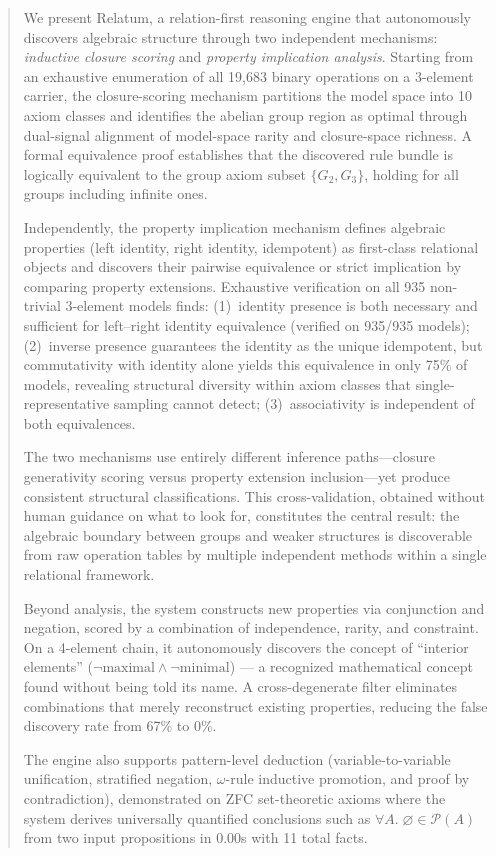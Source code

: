 \begin{abstract}

We present Relatum, a relation-first reasoning engine that autonomously discovers algebraic structure through two independent mechanisms: \emph{inductive closure scoring} and \emph{property implication analysis}. Starting from an exhaustive enumeration of all 19{,}683 binary operations on a 3-element carrier, the closure-scoring mechanism partitions the model space into 10 axiom classes and identifies the abelian group region as optimal through dual-signal alignment of model-space rarity and closure-space richness. A formal equivalence proof establishes that the discovered rule bundle is logically equivalent to the group axiom subset $\{G_2, G_3\}$, holding for all groups including infinite ones.

Independently, the property implication mechanism defines algebraic properties (left identity, right identity, idempotent) as first-class relational objects and discovers their pairwise equivalence or strict implication by comparing property extensions. Exhaustive verification on all 935 non-trivial 3-element models finds: (1)~identity presence is both necessary and sufficient for left--right identity equivalence (verified on 935/935 models); (2)~inverse presence guarantees the identity as the unique idempotent, but commutativity with identity alone yields this equivalence in only 75\% of models, revealing structural diversity within axiom classes that single-representative sampling cannot detect; (3)~associativity is independent of both equivalences.

The two mechanisms use entirely different inference paths---closure generativity scoring versus property extension inclusion---yet produce consistent structural classifications. This cross-validation, obtained without human guidance on what to look for, constitutes the central result: the algebraic boundary between groups and weaker structures is discoverable from raw operation tables by multiple independent methods within a single relational framework.

Beyond analysis, the system constructs new properties via conjunction and negation, scored by a combination of independence, rarity, and constraint. On a 4-element chain, it autonomously discovers the concept of ``interior elements'' ($\lnot\text{maximal} \wedge \lnot\text{minimal}$) --- a recognized mathematical concept found without being told its name. A cross-degenerate filter eliminates combinations that merely reconstruct existing properties, reducing the false discovery rate from 67\% to 0\%.

The engine also supports pattern-level deduction (variable-to-variable unification, stratified negation, $\omega$-rule inductive promotion, and proof by contradiction), demonstrated on ZFC set-theoretic axioms where the system derives universally quantified conclusions such as $\forall A.\;\varnothing \in \mathcal{P}(A)$ from two input propositions in 0.00s with 11 total facts.

\end{abstract}
